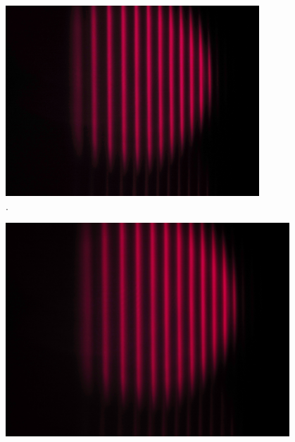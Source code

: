 \begin{figure}[h!]
  \centering
  \includegraphics[width=0.85\textwidth]{data/temp/rot_ohneB_90_aufgehellt.JPG}
  \caption{\cite{insert Beschriftung 7}.}
  \label{fig:roteOhneB90_aufgehellt}
\end{figure}
\begin{figure}[h!]
  \centering
  \includegraphics[width=0.95\textwidth]{data/temp/rot_mitB_90_aufgehellt.JPG}
  \caption{\cite{insert Beschriftung 8}}
  \label{fig:rotMitB90_aufgehellt}
\end{figure}



